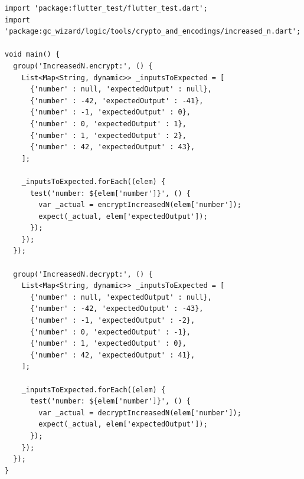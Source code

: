 \begin{lstlisting}
import 'package:flutter_test/flutter_test.dart';
import 'package:gc_wizard/logic/tools/crypto_and_encodings/increased_n.dart';

void main() {
  group('IncreasedN.encrypt:', () {
    List<Map<String, dynamic>> _inputsToExpected = [
      {'number' : null, 'expectedOutput' : null},
      {'number' : -42, 'expectedOutput' : -41},
      {'number' : -1, 'expectedOutput' : 0},
      {'number' : 0, 'expectedOutput' : 1},
      {'number' : 1, 'expectedOutput' : 2},
      {'number' : 42, 'expectedOutput' : 43},
    ];

    _inputsToExpected.forEach((elem) {
      test('number: ${elem['number']}', () {
        var _actual = encryptIncreasedN(elem['number']);
        expect(_actual, elem['expectedOutput']);
      });
    });
  });

  group('IncreasedN.decrypt:', () {
    List<Map<String, dynamic>> _inputsToExpected = [
      {'number' : null, 'expectedOutput' : null},
      {'number' : -42, 'expectedOutput' : -43},
      {'number' : -1, 'expectedOutput' : -2},
      {'number' : 0, 'expectedOutput' : -1},
      {'number' : 1, 'expectedOutput' : 0},
      {'number' : 42, 'expectedOutput' : 41},
    ];

    _inputsToExpected.forEach((elem) {
      test('number: ${elem['number']}', () {
        var _actual = decryptIncreasedN(elem['number']);
        expect(_actual, elem['expectedOutput']);
      });
    });
  });
}
\end{lstlisting}
\label{fig: test}


